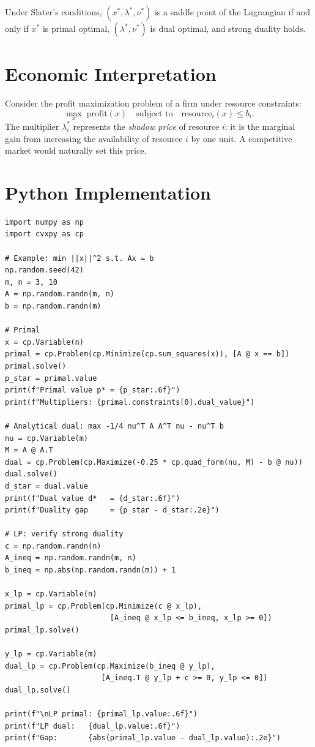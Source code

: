 \begin{theorem}
Under Slater's conditions, $(x^*, \lambda^*, \nu^*)$ is a saddle point of the
Lagrangian if and only if $x^*$ is primal optimal, $(\lambda^*, \nu^*)$ is dual
optimal, and strong duality holds.
\end{theorem}

\section{Economic Interpretation}

\begin{intuition}
Consider the profit maximization problem of a firm under resource constraints:
\[
    \max_x \; \mathrm{profit}(x) \quad \text{subject to} \quad
    \mathrm{resource}_i(x) \leq b_i.
\]
The multiplier $\lambda_i^*$ represents the \emph{shadow price} of resource $i$:
it is the marginal gain from increasing the availability of resource $i$ by one unit.
A competitive market would naturally set this price.
\end{intuition}

\section{Python Implementation}

\begin{codeblock}[title=\textbf{Lagrangian duality and duality gap}]
\begin{verbatim}
import numpy as np
import cvxpy as cp

# Example: min ||x||^2 s.t. Ax = b
np.random.seed(42)
m, n = 3, 10
A = np.random.randn(m, n)
b = np.random.randn(m)

# Primal
x = cp.Variable(n)
primal = cp.Problem(cp.Minimize(cp.sum_squares(x)), [A @ x == b])
primal.solve()
p_star = primal.value
print(f"Primal value p* = {p_star:.6f}")
print(f"Multipliers: {primal.constraints[0].dual_value}")

# Analytical dual: max -1/4 nu^T A A^T nu - nu^T b
nu = cp.Variable(m)
M = A @ A.T
dual = cp.Problem(cp.Maximize(-0.25 * cp.quad_form(nu, M) - b @ nu))
dual.solve()
d_star = dual.value
print(f"Dual value d*   = {d_star:.6f}")
print(f"Duality gap     = {p_star - d_star:.2e}")

# LP: verify strong duality
c = np.random.randn(n)
A_ineq = np.random.randn(m, n)
b_ineq = np.abs(np.random.randn(m)) + 1

x_lp = cp.Variable(n)
primal_lp = cp.Problem(cp.Minimize(c @ x_lp),
                        [A_ineq @ x_lp <= b_ineq, x_lp >= 0])
primal_lp.solve()

y_lp = cp.Variable(m)
dual_lp = cp.Problem(cp.Maximize(b_ineq @ y_lp),
                      [A_ineq.T @ y_lp + c >= 0, y_lp <= 0])
dual_lp.solve()

print(f"\nLP primal: {primal_lp.value:.6f}")
print(f"LP dual:   {dual_lp.value:.6f}")
print(f"Gap:       {abs(primal_lp.value - dual_lp.value):.2e}")
\end{verbatim}
\end{codeblock}

